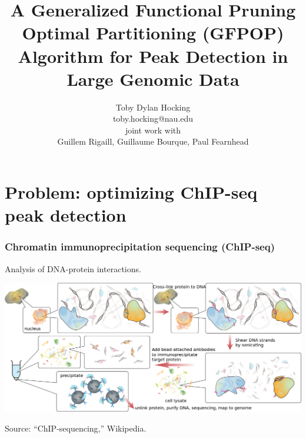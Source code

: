 \documentclass{beamer}
\begin{document}
\title{ A Generalized Functional Pruning Optimal Partitioning (GFPOP)
  Algorithm for Peak Detection in Large Genomic Data }

\author{
  Toby Dylan Hocking\\
  toby.hocking@nau.edu\\
  joint work with \\
Guillem Rigaill, Guillaume Bourque, Paul Fearnhead}


\maketitle

\section{Problem: optimizing ChIP-seq peak detection}

\begin{frame}
  \frametitle{Chromatin immunoprecipitation sequencing (ChIP-seq)}
  Analysis of DNA-protein interactions.

  \includegraphics[width=\textwidth]{Chromatin_immunoprecipitation_sequencing_wide.png}

  Source: ``ChIP-sequencing,'' Wikipedia.
\end{frame}
\end{document}
